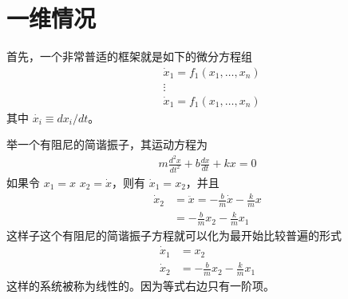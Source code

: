 \chapter{一维情况}
首先，一个非常普适的框架就是如下的微分方程组
\begin{equation}
    \begin{aligned} 
        &\dot{x}_1 = f_1(x_1,\dots,x_n)  \\
        &\vdots \\
        &\dot{x}_1 = f_1(x_1,\dots,x_n)  
    \end{aligned} 
\end{equation}
其中 $ \dot{x_i} \equiv dx_i/dt $。
\par 举一个有阻尼的简谐振子，其运动方程为
\begin{equation}
    \begin{aligned} 
        m\frac{d^2x}{dt^2} + b\frac{dx}{dt} + kx = 0
    \end{aligned} 
\end{equation}
如果令 $ x_1 = x $ $ x_2 = \dot{x} $，则有 $ \dot{x}_1 = x_2 $，并且
\begin{equation}
    \begin{aligned} 
    \dot{x}_2 &= \ddot{x} = -\frac{b}{m}\dot{x} - \frac{k}{m}x\\
        &= -\frac{b}{m}x_2 - \frac{k}{m}x_1
    \end{aligned} 
\end{equation} 
这样子这个有阻尼的简谐振子方程就可以化为最开始比较普遍的形式
\begin{equation}
    \begin{aligned} 
    \dot{x}_1 &= x_2 \\
    \dot{x}_2 &= -\frac{b}{m} x_2 - \frac{k}{m}x_1
    \end{aligned} 
\end{equation}
这样的系统被称为线性的。因为等式右边只有一阶项。
